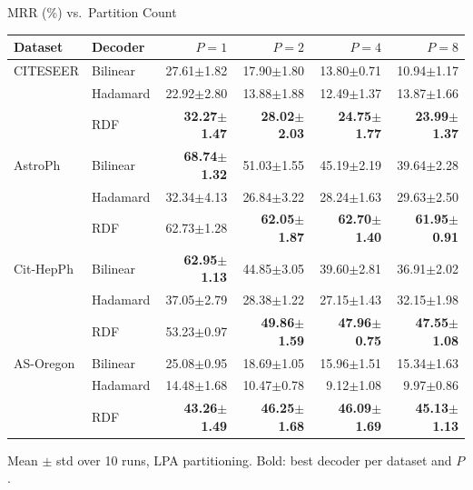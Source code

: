 \documentclass[aspectratio=169]{beamer}
\begin{document}
\begin{frame}{MRR (\%) vs.\ Partition Count}
  \scriptsize
  \begin{tabular}{llrrrr}
    \toprule
    Dataset & Decoder & $P{=}1$ & $P{=}2$ & $P{=}4$ & $P{=}8$ \\
    \midrule
    CITESEER  & Bilinear  & 27.61$\pm$1.82 & 17.90$\pm$1.80 & 13.80$\pm$0.71 & 10.94$\pm$1.17 \\
              & Hadamard  & 22.92$\pm$2.80 & 13.88$\pm$1.88 & 12.49$\pm$1.37 & 13.87$\pm$1.66 \\
              & RDF       & \textbf{32.27$\pm$1.47} & \textbf{28.02$\pm$2.03} & \textbf{24.75$\pm$1.77} & \textbf{23.99$\pm$1.37} \\
    \midrule
    AstroPh   & Bilinear  & \textbf{68.74$\pm$1.32} & 51.03$\pm$1.55 & 45.19$\pm$2.19 & 39.64$\pm$2.28 \\
              & Hadamard  & 32.34$\pm$4.13 & 26.84$\pm$3.22 & 28.24$\pm$1.63 & 29.63$\pm$2.50 \\
              & RDF       & 62.73$\pm$1.28 & \textbf{62.05$\pm$1.87} & \textbf{62.70$\pm$1.40} & \textbf{61.95$\pm$0.91} \\
    \midrule
    Cit-HepPh & Bilinear  & \textbf{62.95$\pm$1.13} & 44.85$\pm$3.05 & 39.60$\pm$2.81 & 36.91$\pm$2.02 \\
              & Hadamard  & 37.05$\pm$2.79 & 28.38$\pm$1.22 & 27.15$\pm$1.43 & 32.15$\pm$1.98 \\
              & RDF       & 53.23$\pm$0.97 & \textbf{49.86$\pm$1.59} & \textbf{47.96$\pm$0.75} & \textbf{47.55$\pm$1.08} \\
    \midrule
    AS-Oregon & Bilinear  & 25.08$\pm$0.95 & 18.69$\pm$1.05 & 15.96$\pm$1.51 & 15.34$\pm$1.63 \\
              & Hadamard  & 14.48$\pm$1.68 & 10.47$\pm$0.78 & 9.12$\pm$1.08 & 9.97$\pm$0.86 \\
              & RDF       & \textbf{43.26$\pm$1.49} & \textbf{46.25$\pm$1.68} & \textbf{46.09$\pm$1.69} & \textbf{45.13$\pm$1.13} \\
    \bottomrule
  \end{tabular}

  \vspace{0.5em}
  \scriptsize Mean $\pm$ std over 10 runs, LPA partitioning. Bold: best decoder per dataset and $P$.
\end{frame}
\end{document}
